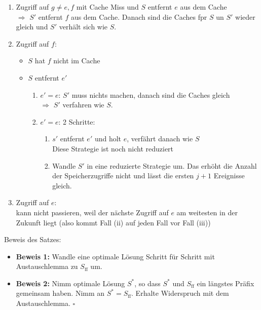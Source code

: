 \begin{enumerate}
 \item Zugriff auf $g \neq e, f$ mit Cache Miss und $S$ entfernt $e$ aus dem Cache\\
     $\Rightarrow$ $S'$ entfernt $f$ aus dem Cache. Danach sind die Caches fpr $S$ un $S'$ wieder gleich und $S'$ verhält sich wie $S$.
 \item Zugriff auf $f$:
    \begin{itemize}
     \item $S$ hat $f$ nicht im Cache
     \item $S$ entfernt $e'$
     \renewcommand{\labelenumii}{(\theenumii)}
     \renewcommand{\theenumii}{\alph{enumii}}
     \begin{enumerate}
     \item $e' = e$: $S'$ muss nichts machen, danach sind die Caches gleich\\
         $\Rightarrow$ $S'$ verfahren wie $S$.
     \item $e' = e$: 2 Schritte:
     \renewcommand{\labelenumiii}{\theenumiii. Schritt:}
     \renewcommand{\theenumiii}{\arabic{enumiii}}
         \begin{enumerate}
         \item $s'$ entfernt $e'$ und holt $e$, verfährt danach wie $S$\\
                 Diese Strategie ist noch nicht reduziert
         \item Wandle $S'$ in eine reduzierte Strategie um. Das erhöht die Anzahl der Speicherzugriffe nicht und lässt die ersten $j+1$ Ereignisse gleich.
         \end{enumerate}
     \end{enumerate}
    \end{itemize}
 \item Zugriff auf $e$:\\
     kann nicht passieren, weil der nächste Zugriff auf $e$ am weitesten in der Zukunft liegt (also kommt Fall (ii) auf jeden Fall vor Fall (iii))
\end{enumerate}
Beweis des Satzes:
\begin{itemize}
 \item \textbf{Beweis 1:} Wandle eine optimale Lösung Schritt für Schritt mit Austauschlemma zu $S_{\text{ff}}$ um.
 \item \textbf{Beweis 2:} Nimm optimale Lösung $S^*$, so dass $S^*$ und $S_{\text{ff}}$ ein längstes Präfix gemeinsam haben. Nimm an $S^* = S_{\text{ff}}$. Erhalte Widerspruch mit dem Austauschlemma. \hfill$\square$
\end{itemize}


